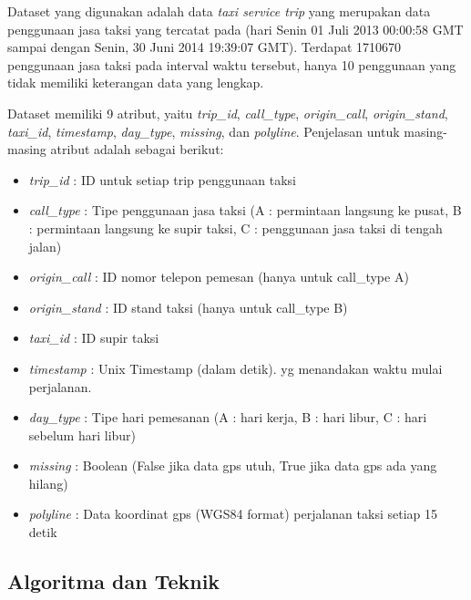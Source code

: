 \documentclass{article}
\begin{document}
\begin{adjustwidth}{2em}{0pt}

\hspace{\parindent}Dataset yang digunakan adalah data \textit{taxi service trip} yang merupakan data penggunaan jasa taksi yang tercatat pada (hari Senin 01 Juli 2013 00:00:58 GMT sampai dengan Senin, 30 Juni 2014 19:39:07 GMT). Terdapat 1710670 penggunaan jasa taksi pada interval waktu tersebut, hanya 10 penggunaan yang tidak memiliki keterangan data yang lengkap.

Dataset memiliki 9 atribut, yaitu \textit{trip\_id}, \textit{call\_type}, \textit{origin\_call}, \textit{origin\_stand}, \textit{taxi\_id}, \textit{timestamp}, \textit{day\_type}, \textit{missing}, dan \textit{polyline}. Penjelasan untuk masing-masing atribut adalah sebagai berikut:

\begin{itemize}
\item{\textit{trip\_id} : ID untuk setiap trip penggunaan taksi}
\item{\textit{call\_type} : Tipe penggunaan jasa taksi (A : permintaan langsung ke pusat, B : permintaan langsung ke supir taksi, C : penggunaan jasa taksi di tengah jalan)}
\item{\textit{origin\_call} : ID nomor telepon pemesan (hanya untuk call\_type A)}
\item{\textit{origin\_stand} : ID stand taksi (hanya untuk call\_type B)}
\item{\textit{taxi\_id} : ID supir taksi}
\item{\textit{timestamp} : Unix Timestamp (dalam detik). yg menandakan waktu mulai perjalanan.}
\item{\textit{day\_type} :  Tipe hari pemesanan (A : hari kerja, B : hari libur, C : hari sebelum hari libur)}
\item{\textit{missing} : Boolean (False jika data gps utuh, True jika data gps ada yang hilang)}
\item{\textit{polyline} : Data koordinat gps (WGS84 format) perjalanan taksi setiap 15 detik}
\end{itemize}

\end{adjustwidth}

\subsection{Algoritma dan Teknik}
\end{document}
